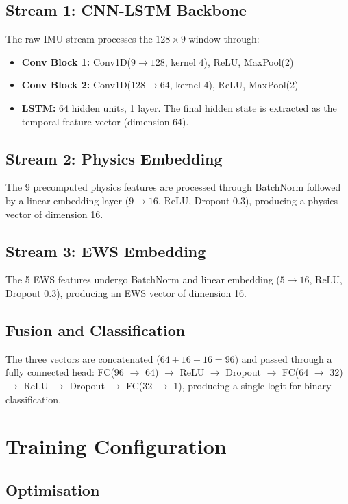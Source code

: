 \documentclass[12pt,a4paper,oneside]{report}
\numberwithin{equation}{chapter}
\numberwithin{figure}{chapter}
\numberwithin{table}{chapter}
\begin{document}
\subsection{Stream 1: CNN-LSTM Backbone}

The raw IMU stream processes the $128 \times 9$ window through:
\begin{itemize}[leftmargin=*, itemsep=2pt]
  \item \textbf{Conv Block 1:} Conv1D($9 \to 128$, kernel 4), ReLU, MaxPool(2)
  \item \textbf{Conv Block 2:} Conv1D($128 \to 64$, kernel 4), ReLU, MaxPool(2)
  \item \textbf{LSTM:} 64 hidden units, 1 layer. The final hidden state is extracted as the temporal feature vector (dimension 64).
\end{itemize}

\subsection{Stream 2: Physics Embedding}

The 9 precomputed physics features are processed through BatchNorm followed by a linear embedding layer ($9 \to 16$, ReLU, Dropout 0.3), producing a physics vector of dimension 16.

\subsection{Stream 3: EWS Embedding}

The 5 EWS features undergo BatchNorm and linear embedding ($5 \to 16$, ReLU, Dropout 0.3), producing an EWS vector of dimension 16.

\subsection{Fusion and Classification}

The three vectors are concatenated ($64 + 16 + 16 = 96$) and passed through a fully connected head: FC(96 $\to$ 64) $\to$ ReLU $\to$ Dropout $\to$ FC(64 $\to$ 32) $\to$ ReLU $\to$ Dropout $\to$ FC(32 $\to$ 1), producing a single logit for binary classification.

\section{Training Configuration}

\subsection{Optimisation}
\end{document}
